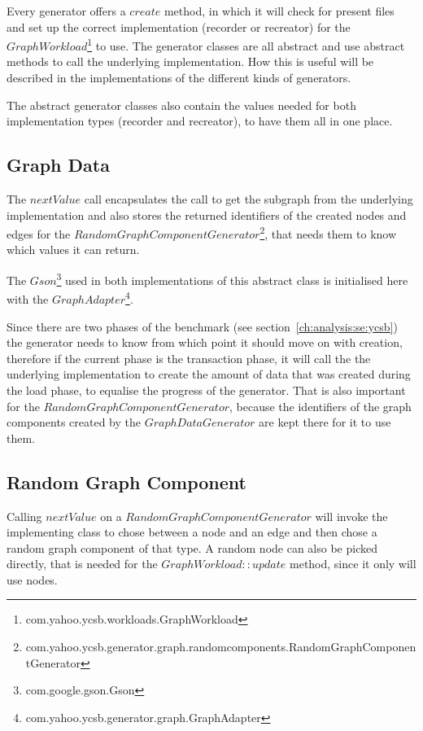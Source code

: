 Every generator offers a $ create $ method,
in which it will check for present files and set up the correct implementation (recorder or recreator) for the $ GraphWorkload $\footnote{com.yahoo.ycsb.workloads.GraphWorkload} to use.
The generator classes are all abstract and use abstract methods to call the underlying implementation.
How this is useful will be described in the implementations of the different kinds of generators.

The abstract generator classes also contain the values needed for both implementation types (recorder and recreator),
to have them all in one place.

\subsection{Graph Data}
The $ nextValue $ call encapsulates the call to get the subgraph from the underlying implementation and also stores the returned identifiers of the created nodes and edges for the $ RandomGraphComponentGenerator $\footnote{com.yahoo.ycsb.generator.graph.randomcomponents.RandomGraphComponentGenerator},
that needs them to know which values it can return.

The $ Gson $\footnote{com.google.gson.Gson} used in both implementations of this abstract class is initialised here with the $ GraphAdapter $\footnote{com.yahoo.ycsb.generator.graph.GraphAdapter}.

Since there are two phases of the benchmark (see section~\ref{ch:analysis:se:ycsb}) the generator needs to know from which point it should move on with creation,
therefore if the current phase is the transaction phase,
it will call the the underlying implementation to create the amount of data that was created during the load phase,
to equalise the progress of the generator.
That is also important for the $ RandomGraphComponentGenerator $,
because the identifiers of the graph components created by the $ GraphDataGenerator $ are kept there for it to use them.

\subsection{Random Graph Component}
Calling $ nextValue $ on a $ RandomGraphComponentGenerator $ will invoke the implementing class to chose between a node and an edge and then chose a random graph component of that type.
A random node can also be picked directly,
that is needed for the $ GraphWorkload::update $ method,
since it only will use nodes.


